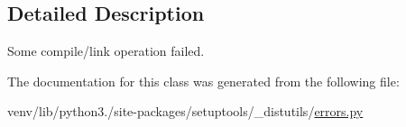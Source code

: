 \subsection{Detailed Description}
\begin{DoxyVerb}Some compile/link operation failed.\end{DoxyVerb}
 

The documentation for this class was generated from the following file\+:\begin{DoxyCompactItemize}
\item 
venv/lib/python3./site-\/packages/setuptools/\+\_\+distutils/\hyperlink{__distutils_2errors_8py}{errors.\+py}\end{DoxyCompactItemize}
